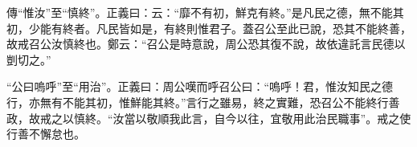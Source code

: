 {\noindent\zhuan{}\fzbyks 傳“惟汝”至“慎終”。正義曰：云：“靡不有初，鮮克有終。”是凡民之德，無不能其初，少能有終者。凡民皆如是，有終則惟君子。蓋召公至此已說，恐其不能終善，故戒召公汝慎終也。鄭云：“召公是時意說，周公恐其復不說，故依違託言民德以剴切之。” \par}

{\noindent\shu{}\fzkt “公曰嗚呼”至“用治”。正義曰：周公嘆而呼召公曰：“嗚呼！君，惟汝知民之德行，亦無有不能其初，惟鮮能其終。”言行之雖易，終之實難，恐召公不能終行善政，故戒之以慎終。“汝當以敬順我此言，自今以往，宜敬用此治民職事”。戒之使行善不懈怠也。 \par}

